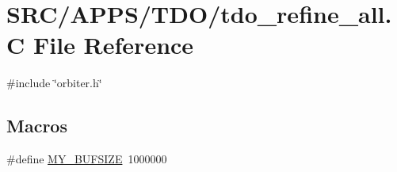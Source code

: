 \hypertarget{tdo__refine__all_8_c}{}\section{S\+R\+C/\+A\+P\+P\+S/\+T\+D\+O/tdo\+\_\+refine\+\_\+all.C File Reference}
\label{tdo__refine__all_8_c}
{\ttfamily \#include \char`\"{}orbiter.\+h\char`\"{}}\newline
\subsection*{Macros}
\begin{DoxyCompactItemize}
\item 
\#define \mbox{\hyperlink{tdo__refine__all_8_c_a6079b3b36c54787d2dca2de2fb2c96df}{M\+Y\+\_\+\+B\+U\+F\+S\+I\+ZE}}~1000000
\end{DoxyCompactItemize}
